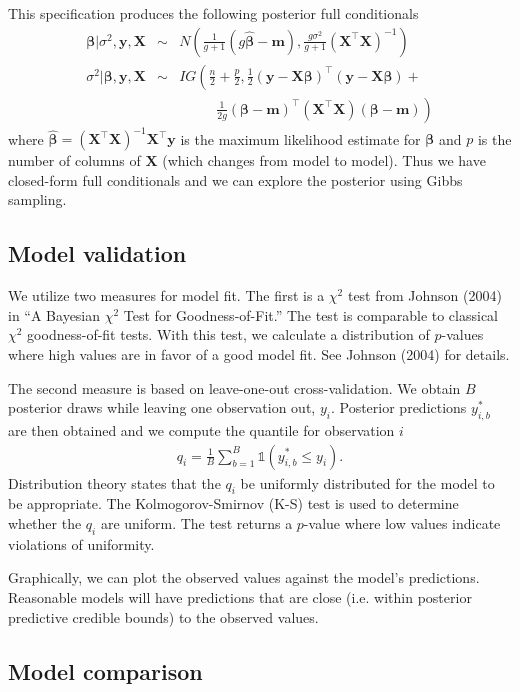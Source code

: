 \documentclass{asaproc}
\newcommand{\m}[1]{\mathbf{\bm{#1}}}
\begin{document}
This specification produces the following posterior full conditionals
\begin{eqnarray*}
\m{\beta}|\sigma^2, \m{y}, \m{X} &\sim& N\left(\frac{1}{g+1}(g\hat{\m{\beta}}-\m{m}), \frac{g\sigma^2}{g+1}(\m{X}^\top\m{X})^{-1}\right) \\
\sigma^2|\m{\beta}, \m{y}, \m{X} &\sim& IG\left(\frac{n}{2}+\frac{p}{2}, \frac{1}{2}(\m{y}-\m{X}\m{\beta})^\top(\m{y}-\m{X}\m{\beta})\right.+ \\
& & ~~~~ ~~~~ ~~~~ \left.\frac{1}{2g}(\m{\beta}-\m{m})^\top(\m{X}^\top\m{X})(\m{\beta}-\m{m})\right)
\end{eqnarray*}
where $\hat{\m{\beta}}=(\m{X}^\top\m{X})^{-1}\m{X}^\top\m{y}$ is the maximum likelihood estimate for $\m{\beta}$ and $p$ is the number of columns of $\m{X}$ (which changes from model to model). Thus we have closed-form full conditionals and we can explore the posterior using Gibbs sampling.

\subsection{Model validation}

We utilize two measures for model fit. The first is a $\chi^2$ test from Johnson (2004) in ``A Bayesian $\chi^2$ Test for Goodness-of-Fit.'' The test is comparable to classical $\chi^2$ goodness-of-fit tests. With this test, we calculate a distribution of $p$-values where high values are in favor of a good model fit. See Johnson (2004) for details.

The second measure is based on leave-one-out cross-validation. We obtain $B$ posterior draws while leaving one observation out, $y_i$. Posterior predictions $y_{i,b}^*$ are then obtained and we compute the quantile for observation $i$
\begin{eqnarray*}
q_i=\frac{1}{B}\sum_{b=1}^B \mathds{1}(y_{i,b}^* \leq y_i).
\end{eqnarray*}
Distribution theory states that the $q_i$ be uniformly distributed for the model to be appropriate. The Kolmogorov-Smirnov (K-S) test is used to determine whether the $q_i$ are uniform. The test returns a $p$-value where low values indicate violations of uniformity.

Graphically, we can plot the observed values against the model's predictions. Reasonable models will have predictions that are close (i.e. within posterior predictive credible bounds) to the observed values.

\subsection{Model comparison}
\end{document}

